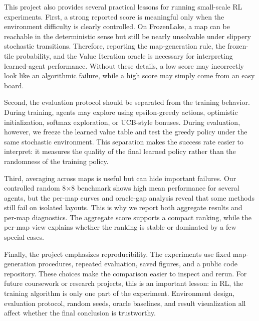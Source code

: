 \documentclass[10pt]{article}
\begin{document}
This project also provides several practical lessons for running small-scale RL experiments. First, a strong reported score is meaningful only when the environment difficulty is clearly controlled. On FrozenLake, a map can be reachable in the deterministic sense but still be nearly unsolvable under slippery stochastic transitions. Therefore, reporting the map-generation rule, the frozen-tile probability, and the Value Iteration oracle is necessary for interpreting learned-agent performance. Without these details, a low score may incorrectly look like an algorithmic failure, while a high score may simply come from an easy board.

Second, the evaluation protocol should be separated from the training behavior. During training, agents may explore using epsilon-greedy actions, optimistic initialization, softmax exploration, or UCB-style bonuses. During evaluation, however, we freeze the learned value table and test the greedy policy under the same stochastic environment. This separation makes the success rate easier to interpret: it measures the quality of the final learned policy rather than the randomness of the training policy.

Third, averaging across maps is useful but can hide important failures. Our controlled random 8$\times$8 benchmark shows high mean performance for several agents, but the per-map curves and oracle-gap analysis reveal that some methods still fail on isolated layouts. This is why we report both aggregate results and per-map diagnostics. The aggregate score supports a compact ranking, while the per-map view explains whether the ranking is stable or dominated by a few special cases.

Finally, the project emphasizes reproducibility. The experiments use fixed map-generation procedures, repeated evaluation, saved figures, and a public code repository. These choices make the comparison easier to inspect and rerun. For future coursework or research projects, this is an important lesson: in RL, the training algorithm is only one part of the experiment. Environment design, evaluation protocol, random seeds, oracle baselines, and result visualization all affect whether the final conclusion is trustworthy.
\end{document}
